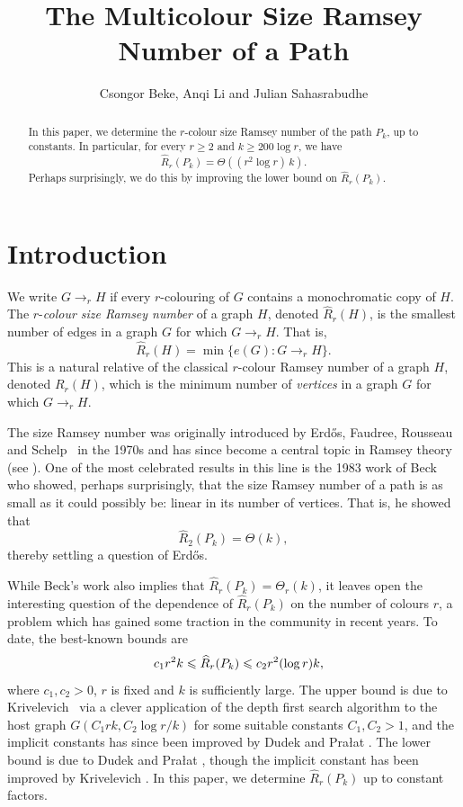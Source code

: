 \documentclass[12pt,reqno]{amsart}
\title{The Multicolour Size Ramsey Number of a Path}
\author{Csongor Beke, Anqi Li and Julian Sahasrabudhe}
\theoremstyle{remark}
\numberwithin{theorem}{section}
\renewcommand{\(}{\bigl(}
\renewcommand{\)}{\bigr)\vphantom{)}}
\renewcommand{\leq}{\le}
\renewcommand{\geq}{\ge}
\renewcommand{\le}{\leqslant}
\renewcommand{\ge}{\geqslant}
\begin{document}
\begin{abstract}
 In this paper, we determine the $r$-colour size Ramsey number of the path $P_k$, up to constants. In particular, for every $r \geq 2$ and $k \geq 200\log r$, we have
    \[ \widehat{R}_r(P_k)=\Theta((r^2 \log r) \, k).\] 
Perhaps surprisingly, we do this by improving the lower bound on $\widehat{R}_r(P_k)$.
\end{abstract}
\maketitle


\vspace{-2em}

\section{Introduction}

We write $G \to_r H$ if every $r$-colouring of $G$ contains a monochromatic copy of $H$. The $r$-\emph{colour size Ramsey number} of a graph $H$, denoted $\widehat{R}_r(H)$, is the smallest number of edges in a graph $G$ for which $G \to_r H$. That is,
\[ \widehat{R}_r(H)= \min \{ e(G) : G \to_r H \}.\] 
This is a natural relative of the classical $r$-colour Ramsey number of a graph $H$, denoted $R_r(H)$, which is the minimum number of \emph{vertices} in a graph $G$ for which $G\rightarrow_r H$.

The size Ramsey number was originally introduced by Erd\H{o}s, Faudree, Rousseau and Schelp~\cite{EFRS78} in the 1970s and has since become a central topic in  Ramsey theory (see \cite{CFS15}).  One of the most celebrated results in this line is the 1983 work of Beck~\cite{B83} who showed, perhaps surprisingly, that the size Ramsey number of a path is as small as it could possibly be: linear in its number of vertices. That is, he showed that
\[ \widehat{R}_2(P_k)= \Theta(k),\] thereby settling a question of Erd\H{o}s.

While Beck's work also implies that $\widehat{R}_r(P_k)= \Theta_r(k)$, it leaves open the interesting question of the dependence of $\widehat{R}_r(P_k)$ on the number of colours $r$, a problem which has gained some traction in the community in recent years. To date, the best-known bounds are 
\begin{equation}\label{eq:upper}
    \hspace{.8em} c_1 r^2k \leq \widehat{R}_r(P_k) \leq c_2r^2(\log r) k,
\end{equation}
where $c_1,c_2 >0$, $r$ is fixed and $k$ is sufficiently large. The upper bound is due to Krivelevich~\cite{K19} via a clever application of the depth first search algorithm to the host graph $G(C_1rk, C_2\log r/k)$ for some suitable constants $C_1, C_2 > 1$, and the implicit constants has since been improved by Dudek and Pra\l at \cite{DP17}. The lower bound is due to Dudek and Pra\l at \cite{DP17}, though the implicit constant has been improved by Krivelevich \cite{K19}. In this paper, we determine $\widehat{R}_r(P_k)$ up to constant factors. 
\end{document}
